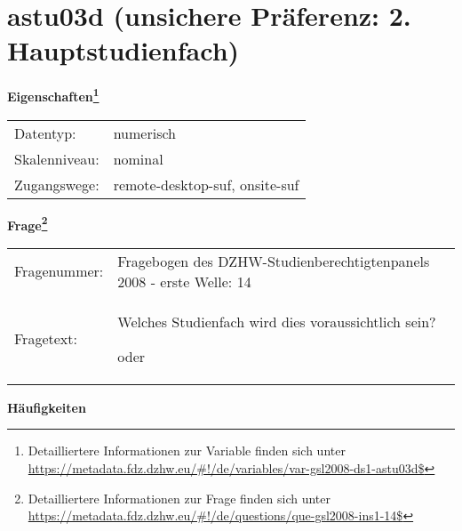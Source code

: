 
    \setcounter{footnote}{0}

    \vspace*{-1.8cm}
	\section{astu03d (unsichere Präferenz: 2. Hauptstudienfach)}
	\label{section:astu03d}



    \vspace*{0.5cm}
    \noindent\textbf{Eigenschaften\footnote{Detailliertere Informationen zur Variable finden sich unter
		\url{https://metadata.fdz.dzhw.eu/\#!/de/variables/var-gsl2008-ds1-astu03d$}}}\\
	\begin{tabularx}{\hsize}{@{}lX}
	Datentyp: & numerisch \\
	Skalenniveau: & nominal \\
	Zugangswege: &
	  remote-desktop-suf, 
	  onsite-suf
 \\
    \end{tabularx}



				\vspace*{0.5cm}
                \noindent\textbf{Frage\footnote{Detailliertere Informationen zur Frage finden sich unter
		              \url{https://metadata.fdz.dzhw.eu/\#!/de/questions/que-gsl2008-ins1-14$}}}\\
				\begin{tabularx}{\hsize}{@{}lX}
					Fragenummer: &
					  Fragebogen des DZHW-Studienberechtigtenpanels 2008 - erste Welle:
					  14
 \\
					Fragetext: & Welches Studienfach wird dies voraussichtlich sein?\par  oder \\
				\end{tabularx}





        		\vspace*{0.5cm}
                \noindent\textbf{Häufigkeiten}

